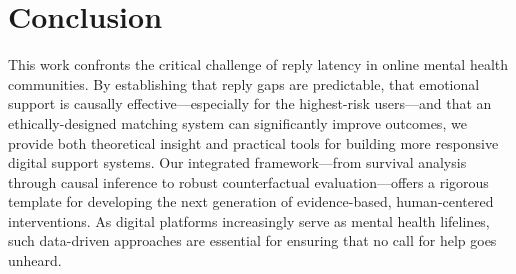 \documentclass[letterpaper]{article} %
\begin{document}
\section{Conclusion}

This work confronts the critical challenge of reply latency in online mental health communities. By establishing that reply gaps are predictable, that emotional support is causally effective—especially for the highest-risk users—and that an ethically-designed matching system can significantly improve outcomes, we provide both theoretical insight and practical tools for building more responsive digital support systems. Our integrated framework—from survival analysis through causal inference to robust counterfactual evaluation—offers a rigorous template for developing the next generation of evidence-based, human-centered interventions. As digital platforms increasingly serve as mental health lifelines, such data-driven approaches are essential for ensuring that no call for help goes unheard.




\end{document}
